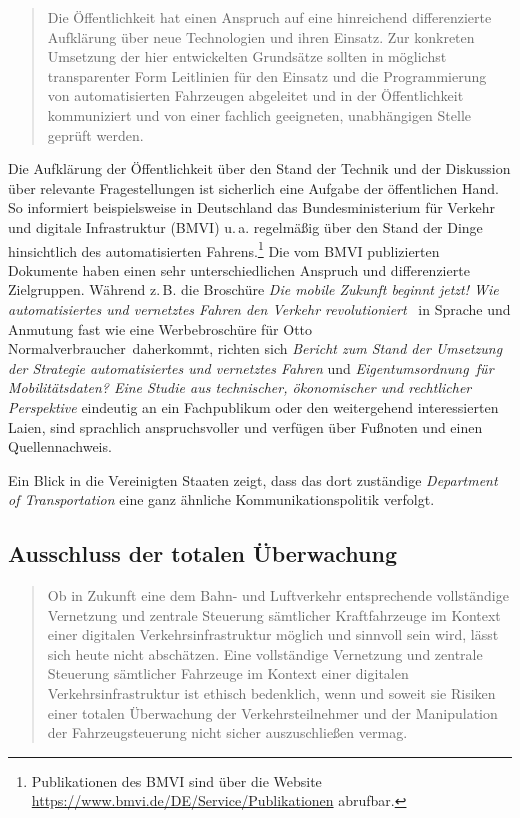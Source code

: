 \documentclass[twoside,a4paper,12pt]{article}
\begin{document}
\begin{quote}
\glqq
Die Öffentlichkeit hat einen Anspruch auf eine hinreichend differenzierte Aufklärung
über neue Technologien und ihren Einsatz. Zur konkreten Umsetzung der hier entwickelten Grundsätze sollten in möglichst 
transparenter Form Leitlinien für den Einsatz und die
Programmierung von automatisierten Fahrzeugen abgeleitet und in der Öffentlichkeit
kommuniziert und von einer fachlich geeigneten, unabhängigen Stelle geprüft werden.\grqq\mbox{~\cite[S. 12]{ek}}
\end{quote}

Die Aufklärung der Öffentlichkeit über den Stand der Technik und der Diskussion über relevante Fragestellungen ist sicherlich eine Aufgabe der öffentlichen
Hand. 
So informiert beispielsweise in Deutschland das Bundesministerium für Verkehr und digitale Infrastruktur (BMVI) u.\,a. regelmäßig über den Stand der Dinge hinsichtlich
des automatisierten Fahrens.\footnote{Publikationen des BMVI sind über die Website \url{https://www.bmvi.de/DE/Service/Publikationen} abrufbar.} Die vom
BMVI publizierten Dokumente haben einen sehr unterschiedlichen Anspruch und differenzierte Zielgruppen. Während z.\,B. die Broschüre \textit{Die mobile 
Zukunft beginnt jetzt! Wie automatisiertes und vernetztes Fahren den Verkehr revolutioniert}~\cite{bmvi3} in Sprache und Anmutung fast wie eine Werbebroschüre 
für \glqq Otto Normalverbraucher\grqq\ daherkommt, richten sich \textit{Bericht zum Stand der Umsetzung der Strategie automatisiertes und vernetztes 
Fahren} und \textit{\glqq Eigentumsordnung\grqq\ für Mobilitätsdaten? Eine Studie aus technischer, ökonomischer und rechtlicher Perspektive} eindeutig an ein
Fachpublikum oder den weitergehend interessierten Laien, sind sprachlich anspruchsvoller und verfügen über Fußnoten und einen Quellennachweis.

Ein Blick in die Vereinigten Staaten zeigt, dass das dort zuständige \textit{Department of Transportation} eine ganz ähnliche Kommunikationspolitik
verfolgt.~\cite{dot}

\subsection{Ausschluss der totalen Überwachung} \label{AusschlussDerTotalenUeberwachung}

\begin{quote}
\glqq
Ob in Zukunft eine dem Bahn- und Luftverkehr entsprechende vollständige Vernetzung
und zentrale Steuerung sämtlicher Kraftfahrzeuge im Kontext einer digitalen Verkehrsinfrastruktur möglich und sinnvoll sein wird, 
lässt sich heute nicht abschätzen. Eine vollständige Vernetzung und zentrale Steuerung sämtlicher Fahrzeuge im Kontext einer 
digitalen Verkehrsinfrastruktur ist ethisch bedenklich, wenn und soweit sie Risiken einer totalen Überwachung der Verkehrsteilnehmer 
und der Manipulation der Fahrzeugsteuerung nicht sicher auszuschließen vermag.\grqq\mbox{~\cite[S. 12]{ek}}
\end{quote}
\end{document}
